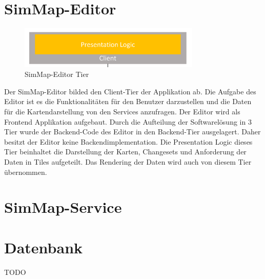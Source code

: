 \section{SimMap-Editor}
\begin{figure}[H]
\centering
\includegraphics[height=2cm]{images/presentationlayer.png}
\caption{SimMap-Editor Tier}
\label{tier_architecture}
\end{figure}
Der SimMap-Editor bilded den Client-Tier der Applikation ab. Die Aufgabe des Editor ist es die Funktionalitäten für den Benutzer darzustellen und die Daten für die Kartendarstellung von den Services anzufragen. Der Editor wird als Frontend Applikation aufgebaut. Durch die Aufteilung der Softwarelösung in 3 Tier wurde der Backend-Code des Editor in den Backend-Tier ausgelagert. Daher besitzt der Editor keine Backendimplementation. Die Presentation Logic dieses Tier beinhaltet die Darstellung der Karten, Changesets und Anforderung der Daten in Tiles aufgeteilt. Das Rendering der Daten wird auch von diesem Tier übernommen.
\section{SimMap-Service}

\section{Datenbank}
TODO